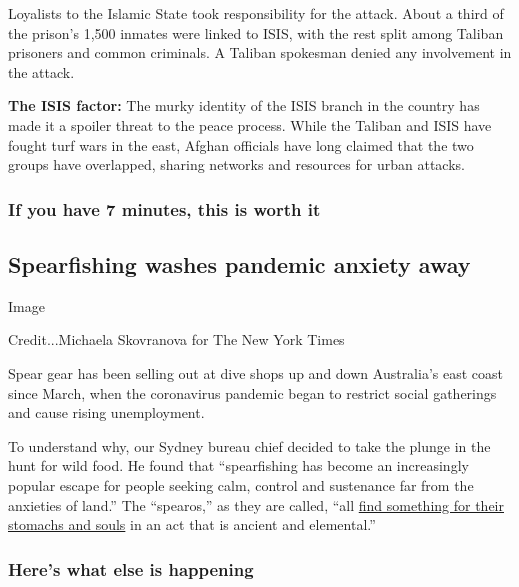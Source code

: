 Loyalists to the Islamic State took responsibility for the attack. About
a third of the prison's 1,500 inmates were linked to ISIS, with the rest
split among Taliban prisoners and common criminals. A Taliban spokesman
denied any involvement in the attack.

\textbf{The ISIS factor:} The murky identity of the ISIS branch in the
country has made it a spoiler threat to the peace process. While the
Taliban and ISIS have fought turf wars in the east, Afghan officials
have long claimed that the two groups have overlapped, sharing networks
and resources for urban attacks.

\hypertarget{if-you-have-7-minutes-this-is-worth-it}{%
\subsubsection{If you have 7 minutes, this is worth
it}\label{if-you-have-7-minutes-this-is-worth-it}}

\hypertarget{spearfishing-washes-pandemic-anxiety-away}{%
\subsection{Spearfishing washes pandemic anxiety
away}\label{spearfishing-washes-pandemic-anxiety-away}}

Image

Credit...Michaela Skovranova for The New York Times

Spear gear has been selling out at dive shops up and down Australia's
east coast since March, when the coronavirus pandemic began to restrict
social gatherings and cause rising unemployment.

To understand why, our Sydney bureau chief decided to take the plunge in
the hunt for wild food. He found that ``spearfishing has become an
increasingly popular escape for people seeking calm, control and
sustenance far from the anxieties of land.'' The ``spearos,'' as they
are called, ``all
\href{https://www.nytimes3xbfgragh.onion/2020/08/03/world/australia/spearfishing-sydney-coronavirus.html}{find
something for their stomachs and souls} in an act that is ancient and
elemental.''

\hypertarget{heres-what-else-is-happening}{%
\subsubsection{Here's what else is
happening}\label{heres-what-else-is-happening}}

